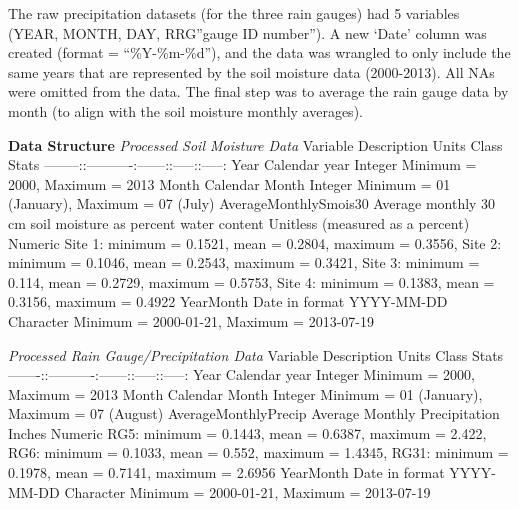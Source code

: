 \documentclass[
  12pt,
]{article}
\begin{document}
The raw precipitation datasets (for the three rain gauges) had 5
variables (YEAR, MONTH, DAY, RRG''gauge ID number''). A new `Date'
column was created (format = ``\%Y-\%m-\%d''), and the data was wrangled
to only include the same years that are represented by the soil moisture
data (2000-2013). All NAs were omitted from the data. The final step was
to average the rain gauge data by month (to align with the soil moisture
monthly averages).

\textbf{Data Structure} \emph{Processed Soil Moisture Data}
\textbar Variable \textbar{} Description \textbar{} Units \textbar{}
Class \textbar{} Stats\textbar{}
\textbar--------:\textbar:----------:\textbar------:\textbar:-----:\textbar:-----:\textbar{}
\textbar Year\textbar{} Calendar year \textbar{} \textbar{} Integer
\textbar{} Minimum = 2000, Maximum = 2013\textbar{}
\textbar Month\textbar{} Calendar Month \textbar{} \textbar{} Integer
\textbar{} Minimum = 01 (January), Maximum = 07 (July)\textbar{}
\textbar AverageMonthlySmois30\textbar{} Average monthly 30 cm soil
moisture as percent water content \textbar{} Unitless (measured as a
percent) \textbar{} Numeric \textbar{} Site 1: minimum = 0.1521, mean =
0.2804, maximum = 0.3556, Site 2: minimum = 0.1046, mean = 0.2543,
maximum = 0.3421, Site 3: minimum = 0.114, mean = 0.2729, maximum =
0.5753, Site 4: minimum = 0.1383, mean = 0.3156, maximum = 0.4922
\textbar{} \textbar YearMonth\textbar{} Date in format YYYY-MM-DD
\textbar{} \textbar{} Character \textbar{} Minimum = 2000-01-21, Maximum
= 2013-07-19\textbar{}

\emph{Processed Rain Gauge/Precipitation Data} Variable \textbar{}
Description \textbar{} Units \textbar{} Class \textbar{} Stats
\textbar-------:\textbar:----------:\textbar------:\textbar:-----:\textbar:-----:\textbar{}
\textbar Year\textbar{} Calendar year \textbar{} \textbar{} Integer
\textbar{} Minimum = 2000, Maximum = 2013\textbar{}
\textbar Month\textbar{} Calendar Month \textbar{} \textbar{} Integer
\textbar{} Minimum = 01 (January), Maximum = 07 (August)\textbar{}
\textbar AverageMonthlyPrecip\textbar{} Average Monthly Precipitation
\textbar{} Inches \textbar{} Numeric \textbar{} RG5: minimum = 0.1443,
mean = 0.6387, maximum = 2.422, RG6: minimum = 0.1033, mean = 0.552,
maximum = 1.4345, RG31: minimum = 0.1978, mean = 0.7141, maximum =
2.6956 \textbar{} \textbar YearMonth\textbar{} Date in format YYYY-MM-DD
\textbar{} \textbar{} Character \textbar{} Minimum = 2000-01-21, Maximum
= 2013-07-19\textbar{}

\newpage
\end{document}
